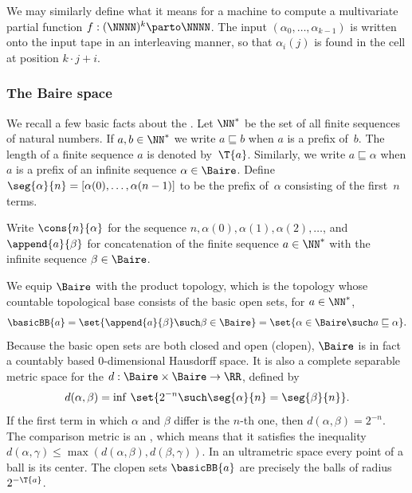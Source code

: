 We may similarly define what it means for a machine to compute a multivariate partial function $f : (\NNNN)^k \parto \NNNN$. The input $(\alpha_0, \ldots, \alpha_{k-1})$ is written onto the input tape in an interleaving manner, so that $\alpha_i(j)$ is found in the cell at position $k \cdot j + i$.

\subsubsection{The Baire space}
\label{sec:baire-space}

We recall a few basic facts about the . Let $\NN^{*}$ be the set of all finite sequences of natural numbers. If $a, b \in \NN^{*}$
we write $a \sqsubseteq b$ when $a$ is a prefix of~$b$. The length of a finite sequence $a$ is denoted by~$\T{a}$. Similarly, we write $a \sqsubseteq \alpha$ when $a$ is a prefix of an infinite sequence $\alpha \in \Baire$. Define $\seg{\alpha}{n} = [\alpha(0), \ldots,
\alpha(n-1)]$ to be the prefix of~$\alpha$ consisting of the first~$n$ terms.

Write $\cons{n}{\alpha}$ for the sequence $n, \alpha(0), \alpha(1), \alpha(2), \ldots$, and $\append{a}{\beta}$ for concatenation of the finite sequence $a \in \NN^{*}$ with the infinite sequence $\beta \in \Baire$.

We equip $\Baire$ with the product topology, which is the topology whose countable topological base consists of the basic open sets, for $a \in \NN^{*}$,
%
\begin{equation*}
  \basicBB{a}
  = \set{\append{a}{\beta} \such \beta \in \Baire}
  = \set{\alpha \in \Baire \such a \sqsubseteq \alpha}.
\end{equation*}
%
Because the basic open sets are both closed and open (clopen),
$\Baire$ is in fact a countably based $0$-dimensional Hausdorff space. It is also a complete
separable metric space for the  $d : \Baire
\times \Baire \to \RR$, defined by
%
\begin{equation*}
  d(\alpha, \beta) = \inf \,\set{2^{-n} \such
    \seg{\alpha}{n} = \seg{\beta}{n}}.
\end{equation*}
%
If the first term in which $\alpha$ and $\beta$ differ is the $n$-th
one, then $d(\alpha, \beta) = 2^{-n}$. The comparison metric is an
, which means that it satisfies the inequality $d(\alpha,
\gamma) \leq \max(d(\alpha, \beta), d(\beta, \gamma))$. In an ultrametric space every point of a ball is its center. The clopen sets $\basicBB{a}$ are precisely the balls of radius $2^{-\T{a}}$.

